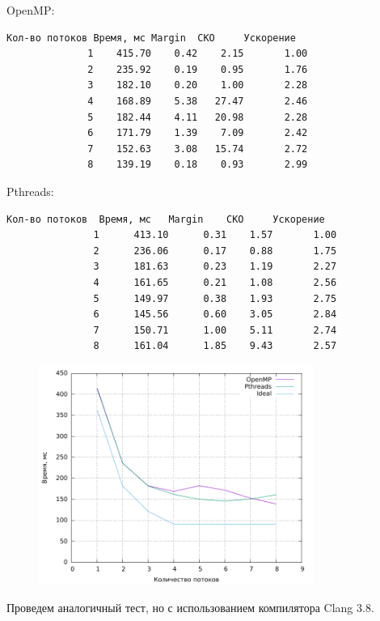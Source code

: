 OpenMP:
\begin{verbatim}
Кол-во потоков Время, мс Margin  СКО     Ускорение  
              1    415.70    0.42    2.15       1.00
              2    235.92    0.19    0.95       1.76
              3    182.10    0.20    1.00       2.28
              4    168.89    5.38   27.47       2.46
              5    182.44    4.11   20.98       2.28
              6    171.79    1.39    7.09       2.42
              7    152.63    3.08   15.74       2.72
              8    139.19    0.18    0.93       2.99
\end{verbatim}

Pthreads:
\begin{verbatim}
Кол-во потоков  Время, мс   Margin    СКО     Ускорение  
               1      413.10      0.31    1.57       1.00
               2      236.06      0.17    0.88       1.75
               3      181.63      0.23    1.19       2.27
               4      161.65      0.21    1.08       2.56
               5      149.97      0.38    1.93       2.75
               6      145.56      0.60    3.05       2.84
               7      150.71      1.00    5.11       2.74
               8      161.04      1.85    9.43       2.57
\end{verbatim}

\begin{figure}[H]
	\centering
	\includegraphics[width=0.8\textwidth]{../plot_gcc/plotAll.pdf}
	\caption{}
\end{figure}

Проведем аналогичный тест, но с использованием компилятора Clang 3.8.

